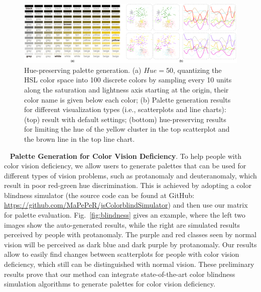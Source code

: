 \documentclass[review,onecolumn]{vgtc}                %
\newcommand{\myparagraph}[1]{\mbox{\ } \newline \noindent \textbf{#1}}
\renewcommand{\paragraph}[1]{\myparagraph{#1}}
\begin{document}
\begin{figure}[h]
\centering
\includegraphics[width=1\linewidth]{hue-preserving.pdf}
\caption{Hue-preserving palette generation. (a) $Hue=50$, quantizing the HSL color space into 100 discrete colors by sampling every 10 units along the saturation and lightness axis starting at the origin, their color name is given below each color; (b) Palette generation results for different visualization types (i.e., scatterplots and line charts): (top) result with default settings; (bottom) hue-preserving results for limiting the hue of the yellow cluster in the top scatterplot and the brown line in the top line chart.}
\vspace*{-5mm}
\label{fig:huepreserving}
\end{figure}

\paragraph{Palette Generation for Color Vision Deficiency}.
To help people with color vision deficiency, we allow users to generate palettes that can be used for different types of vision problems, such as protanomaly and deuteranomaly, which result in poor red-green hue discrimination. This is achieved by adopting a color blindness simulator (the source code can be found at GitHub: \url{https://github.com/MaPePeR/jsColorblindSimulator}) and then use our matrix for palette evaluation. Fig.~\ref{fig:blindness} gives an example, where the left two images show the auto-generated results, while the right are simulated results perceived by people with protanomaly. The purple and red classes seen by normal vision will be perceived as dark blue and dark purple by  protanomaly. Our results allow to easily find changes between scatterplots for people with color vision deficiency, which still can be distinguished with normal vision. These preliminary results prove that our method can integrate state-of-the-art color blindness simulation algorithms to generate palettes for color vision deficiency.
\end{document}
